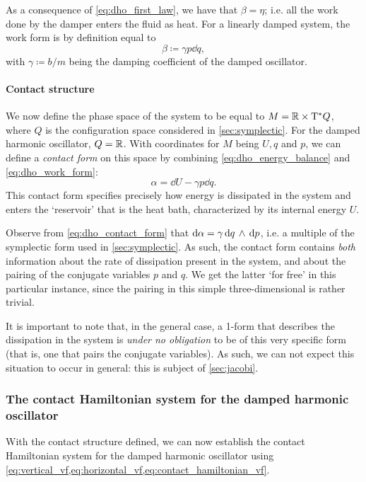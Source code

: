 As a consequence of \cref{eq:dho_first_law}, we have that $ \beta = \eta $; i.e. all the work done by the damper enters the fluid as heat. For a linearly damped system, the work form is by definition equal to 
\begin{equation}
    \beta \coloneq \gamma p \dd{q},
    \label{eq:dho_work_form}
\end{equation}
with $\gamma \coloneq b/m$ being the damping coefficient of the damped oscillator. 

\paragraph{Contact structure} We now define the phase space of the system to be equal to $M = \mathbb{R} \times \mathrm{T}^*Q$, where $Q$ is the configuration space considered in \cref{sec:symplectic}. For the damped harmonic oscillator, $Q = \mathbb{R}$. With coordinates for $M$ being $U, q$ and $p$, we can define a \emph{contact form} on this space by combining \cref{eq:dho_energy_balance} and \cref{eq:dho_work_form}: 
\begin{equation}
    \alpha = \dd{U} - \gamma p \dd{q}.
    \label{eq:dho_contact_form}
\end{equation}
This contact form specifies precisely how energy is dissipated in the system and enters the `reservoir' that is the heat bath, characterized by its internal energy $U$.

Observe from \cref{eq:dho_contact_form} that $\dd{\alpha} = \gamma  \dd{q}\,\wedge\,\dd{p} $, i.e. a multiple of the symplectic form used in \cref{sec:symplectic}. As such, the contact form contains \emph{both} information about the rate of dissipation present in the system, and about the pairing of the conjugate variables $p$ and $q$. We get the latter `for free' in this particular instance, since the pairing in this simple three-dimensional is rather trivial.

It is important to note that, in the general case, a 1-form that describes the dissipation in the system is \emph{under no obligation} to be of this very specific form (that is, one that pairs the conjugate variables). As such, we can not expect this situation to occur in general: this is subject of \cref{sec:jacobi}.

\subsubsection{The contact Hamiltonian system for the damped harmonic oscillator}
With the contact structure defined, we can now establish the contact Hamiltonian system for the damped harmonic oscillator using \cref{eq:vertical_vf,eq:horizontal_vf,eq:contact_hamiltonian_vf}.

